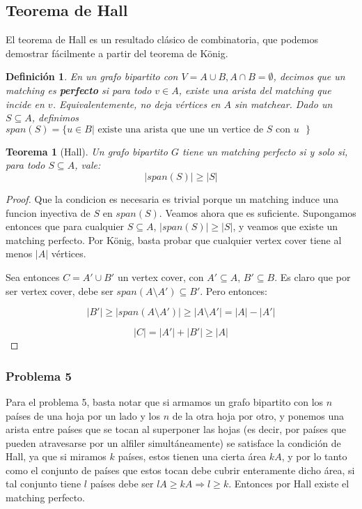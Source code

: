 \documentclass{article}
\newtheorem{teorema}{{\sc Teorema}}
\newtheorem{definicion}{{\sc Definición}}
\begin{document}
\subsection{Teorema de Hall}

El teorema de Hall es un resultado clásico de combinatoria, que podemos demostrar fácilmente a partir del teorema de König.

\begin{definicion}
En un grafo bipartito con $V = A \cup B, A \cap B = \emptyset$, decimos que un matching es \textbf{perfecto} si para todo $v \in A$, existe
una arista del matching que incide en $v$. Equivalentemente, no deja vértices en $A$ sin matchear.
Dado un $S \subseteq A$, definimos $span(S) = \{ u \in B | \mbox{ existe una arista que une un vertice de $S$ con $u$ } \}$
\end{definicion}

\begin{teorema}[Hall]
Un grafo bipartito $G$ tiene un matching perfecto si y solo si, para todo $S \subseteq A$, vale: $$|span(S)| \geq |S|$$
\end{teorema}
\begin{proof}
Que la condicion es necesaria es trivial porque un matching induce una funcion inyectiva de $S$ en $span(S)$. Veamos ahora que es suficiente.
Supongamos entonces que para cualquier $S \subseteq A$, $|span(S)| \geq |S|$, y veamos que existe un matching perfecto. Por König, basta
probar que cualquier vertex cover tiene al menos $|A|$ vértices.

Sea entonces $C = A' \cup  B'$ un vertex cover, con $A' \subseteq A$, $B' \subseteq B$. Es claro que por ser vertex cover, debe ser
$span(A \setminus A') \subseteq B'$. Pero entonces:

$$ |B'| \geq |span(A \setminus A')| \geq |A \setminus A'| = |A| - |A'|$$

$$ |C| = |A'| + |B'| \geq |A|$$

\end{proof}

\subsubsection{Problema 5}

Para el problema 5, basta notar que si armamos un grafo bipartito con los $n$ países de una hoja por un lado y los $n$ de la otra hoja por otro,
y ponemos una arista entre países que se tocan al superponer las hojas (es decir, por países que pueden atravesarse por un alfiler simultáneamente)
se satisface la condición de Hall, ya que si miramos $k$ países, estos tienen una cierta área $kA$, y por lo tanto como el conjunto de países
que estos tocan debe cubrir enteramente dicho área, si tal conjunto tiene $l$ países debe ser $lA \geq kA \Rightarrow l \geq k$.
Entonces por Hall existe el matching perfecto.
\end{document}

